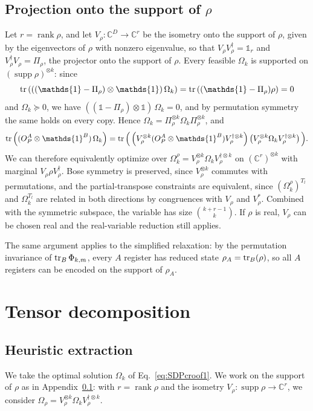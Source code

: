 \documentclass[aps,pra,twocolumn,superscriptaddress]{revtex4-2}
\newcommand{\one}{\mathds{1}}
\newcommand{\I}{\one}
\newcommand{\C}{\mathds{C}}
\begin{document}
\begin{widetext}
\subsection{Projection onto the support of $\rho$}\label{app:supportReduction}
Let $r = \operatorname{rank} \rho$, and let $V_\rho: \C^D \to \C^r$ be the isometry onto the support of $\rho$, given by the eigenvectors of $\rho$ with nonzero eigenvalue, so that $V_\rho V_\rho^\dagger=\I_r$ and $V_\rho^\dagger V_\rho=\Pi_\rho$, the projector onto the support of $\rho$. Every feasible $\Omega_k$ is supported on $(\operatorname{supp}\rho)^{\otimes k}$: since
\begin{equation}
    \tr\left(((\I-\Pi_\rho)\otimes\I)\,\Omega_k\right)=\tr\left((\I-\Pi_\rho)\rho\right)=0
\end{equation}
and $\Omega_k\succeq0$, we have $((\I-\Pi_\rho)\otimes\I)\,\Omega_k=0$, and by permutation symmetry the same holds on every copy. Hence $\Omega_k=\Pi_\rho^{\otimes k}\Omega_k\Pi_\rho^{\otimes k}$, and
\begin{equation}
    \tr\left((O_P^A\otimes\I^B)\,\Omega_k\right)=\tr\Big(\left(V_\rho^{\otimes k}(O_P^A\otimes\I^B)V_\rho^{\dagger\otimes k}\right)\left(V_\rho^{\otimes k}\Omega_kV_\rho^{\dagger\otimes k}\right)\Big).
\end{equation}
We can therefore equivalently optimize over $\Omega_k^\rho=V_\rho^{\otimes k}\Omega_kV_\rho^{\dagger\otimes k}$ on $(\C^r)^{\otimes k}$ with marginal $V_\rho\rho V_\rho^\dagger$. Bose symmetry is preserved, since $V_\rho^{\otimes k}$ commutes with permutations, and the partial-transpose constraints are equivalent, since $(\Omega_k^\rho)^{T_l}$ and $\Omega_k^{T_l}$ are related in both directions by congruences with $V_\rho$ and $V_\rho^*$. Combined with the symmetric subspace, the variable has size $\binom{k+r-1}{k}$. If $\rho$ is real, $V_\rho$ can be chosen real and the real-variable reduction still applies.

The same argument applies to the simplified relaxation: by the permutation invariance of $\tr_B\Phi_{k,m}$, every $A$ register has reduced state $\rho_A=\tr_B(\rho)$, so all $A$ registers can be encoded on the support of $\rho_A$.

\section{Tensor decomposition}
\subsection{Heuristic extraction}\label{app:tensor}
We take the optimal solution $\Omega_k$ of Eq.~\eqref{eq:SDPcroof1}. We work on the support of $\rho$ as in Appendix~\ref{app:supportReduction}: with $r=\operatorname{rank}\rho$ and the isometry $V_\rho:\operatorname{supp}\rho\to\C^r$, we consider $\Omega_\rho=V_\rho^{\otimes k}\Omega_kV_\rho^{\dagger\otimes k}$.


\end{widetext}
\end{document}
